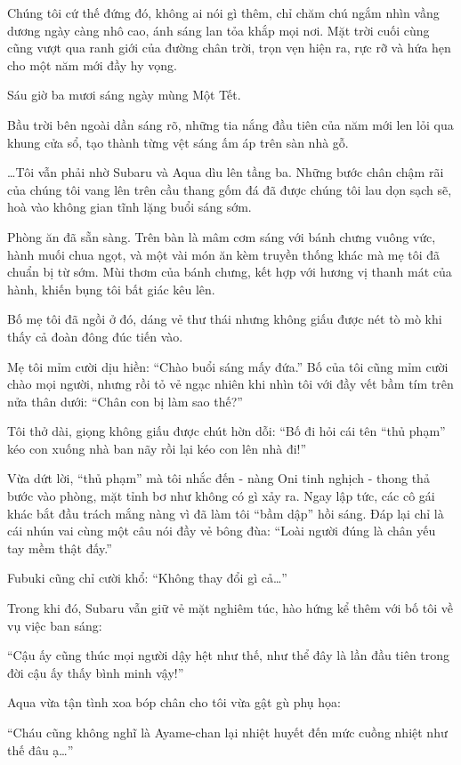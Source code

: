 \documentclass[../main.tex]{subfiles}
\begin{document}
Chúng tôi cứ thế đứng đó, không ai nói gì thêm, chỉ chăm chú ngắm nhìn vầng dương ngày càng nhô cao, ánh sáng lan tỏa khắp mọi nơi. Mặt trời cuối cùng cũng vượt qua ranh giới của đường chân trời, trọn vẹn hiện ra, rực rỡ và hứa hẹn cho một năm mới đầy hy vọng.

\ct

Sáu giờ ba mươi sáng ngày mùng Một Tết.

Bầu trời bên ngoài dần sáng rõ, những tia nắng đầu tiên của năm mới len lỏi qua khung cửa sổ, tạo thành từng vệt sáng ấm áp trên sàn nhà gỗ.

\dots Tôi vẫn phải nhờ Subaru và Aqua dìu lên tầng ba. Những bước chân chậm rãi của chúng tôi vang lên trên cầu thang gốm đá đã được chúng tôi lau dọn sạch sẽ, hoà vào không gian tĩnh lặng buổi sáng sớm.

Phòng ăn đã sẵn sàng. Trên bàn là mâm cơm sáng với bánh chưng vuông vức, hành muối chua ngọt, và một vài món ăn kèm truyền thống khác mà mẹ tôi đã chuẩn bị từ sớm. Mùi thơm của bánh chưng, kết hợp với hương vị thanh mát của hành, khiến bụng tôi bất giác kêu lên.

Bố mẹ tôi đã ngồi ở đó, dáng vẻ thư thái nhưng không giấu được nét tò mò khi thấy cả đoàn đông đúc tiến vào.

Mẹ tôi mỉm cười dịu hiền: ``Chào buổi sáng mấy đứa.'' Bố của tôi cũng mỉm cười chào mọi người, nhưng rồi tỏ vẻ ngạc nhiên khi nhìn tôi với đầy vết bầm tím trên nửa thân dưới: ``Chân con bị làm sao thế?''

Tôi thở dài, giọng không giấu được chút hờn dỗi: ``Bố đi hỏi cái tên ``thủ phạm'' kéo con xuống nhà ban nãy rồi lại kéo con lên nhà đi!''

Vừa dứt lời, ``thủ phạm'' mà tôi nhắc đến - nàng Oni tinh nghịch - thong thả bước vào phòng, mặt tỉnh bơ như không có gì xảy ra. Ngay lập tức, các cô gái khác bắt đầu trách mắng nàng vì đã làm tôi ``bầm dập'' hồi sáng. Đáp lại chỉ là cái nhún vai cùng một câu nói đầy vẻ bông đùa: ``Loài người đúng là chân yếu tay mềm thật đấy.''

Fubuki cũng chỉ cười khổ: ``Không thay đổi gì cả\dots''

Trong khi đó, Subaru vẫn giữ vẻ mặt nghiêm túc, hào hứng kể thêm với bố tôi về vụ việc ban sáng:

``Cậu ấy cũng thúc mọi người dậy hệt như thế, như thể đây là lần đầu tiên trong đời cậu ấy thấy bình minh vậy!''

Aqua vừa tận tình xoa bóp chân cho tôi vừa gật gù phụ họa:

``Cháu cũng không nghĩ là Ayame-chan lại nhiệt huyết đến mức cuồng nhiệt như thế đâu ạ\dots''
\end{document}
